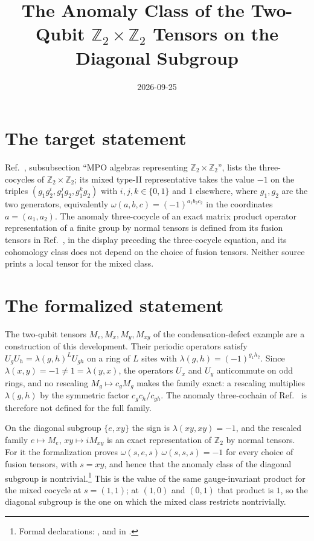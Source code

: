 \documentclass{article}
\title{The Anomaly Class of the Two-Qubit $\mathbb{Z}_2\times\mathbb{Z}_2$
Tensors on the Diagonal Subgroup}
\author{}
\date{2026-09-25}
\begin{document}
\maketitle
{}

\section{The target statement}

Ref.~\cite{GarreRubio2023MPOSym}, subsubsection ``MPO algebras representing
$\mathbb{Z}_2\times\mathbb{Z}_2$'', lists the three-cocycles of
$\mathbb{Z}_2\times\mathbb{Z}_2$; its mixed type-II representative takes
the value $-1$ on the triples $(g_1g_2^i,g_1^jg_2,g_1^kg_2)$ with
$i,j,k\in\{0,1\}$ and $1$ elsewhere, where $g_1,g_2$ are the two
generators,
equivalently $\omega(a,b,c)=(-1)^{a_1b_2c_2}$ in the coordinates
$a=(a_1,a_2)$. The
anomaly three-cocycle of an exact matrix product operator representation
of a finite group by normal tensors is defined from its fusion tensors in
Ref.~\cite{FrancoRubio2025MPUGauging}, in the display preceding the
three-cocycle equation, and its cohomology class does not depend on the
choice of fusion tensors. Neither source prints a local tensor for the
mixed class.

\section{The formalized statement}

The two-qubit tensors $M_e,M_x,M_y,M_{xy}$ of the condensation-defect
example are a construction of this development. Their periodic operators
satisfy $U_gU_h=\lambda(g,h)^LU_{gh}$ on a ring of $L$ sites with
$\lambda(g,h)=(-1)^{g_1h_2}$. Since $\lambda(x,y)=-1\neq1=\lambda(y,x)$,
the operators $U_x$ and $U_y$ anticommute on odd rings, and no rescaling
$M_g\mapsto c_gM_g$ makes the family exact: a rescaling multiplies
$\lambda(g,h)$ by the symmetric factor $c_gc_h/c_{gh}$. The anomaly
three-cochain of Ref.~\cite{FrancoRubio2025MPUGauging} is therefore not
defined for the full family.

On the diagonal subgroup $\{e,xy\}$ the sign is $\lambda(xy,xy)=-1$, and
the rescaled family $e\mapsto M_e$, $xy\mapsto iM_{xy}$ is an exact
representation of $\mathbb{Z}_2$ by normal tensors. For it the formalization
proves $\omega(s,e,s)\,\omega(s,s,s)=-1$ for every choice of fusion
tensors, with $s=xy$, and hence that the anomaly class of the diagonal
subgroup is nontrivial.\footnote{Formal declarations:
,
 and
 in
.}
This is the value of the same gauge-invariant
product for the mixed cocycle at $s=(1,1)$; at $(1,0)$ and $(0,1)$ that
product is $1$, so the diagonal subgroup is the one on which the mixed
class restricts nontrivially.
\end{document}
